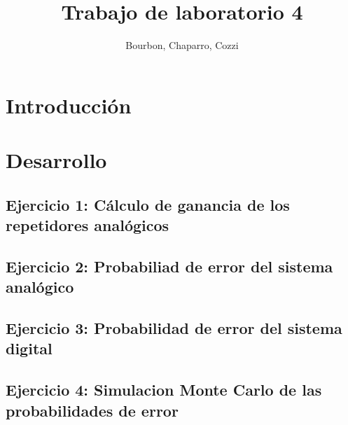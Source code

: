 \documentclass[12pt]{article}
\title{Trabajo de laboratorio 4}
\author{Bourbon, Chaparro, Cozzi}
\begin{document}
	
	
	\pagestyle{fancy}
	
	\setcounter{page}{1}
	
	
	\newpage
	
	\tableofcontents
	
	\newpage
	\section{Introducción}
		
		
	
	\section{Desarrollo}	
		\subsection{Ejercicio 1: Cálculo de ganancia de los repetidores analógicos}
	
			
		
		\subsection{Ejercicio 2: Probabiliad de error del sistema analógico}
		
			
		
		\subsection{Ejercicio 3: Probabilidad de error del sistema digital}
		
			
		
		\subsection{Ejercicio 4: Simulacion Monte Carlo de las probabilidades de error}
			
			
\end{document}
